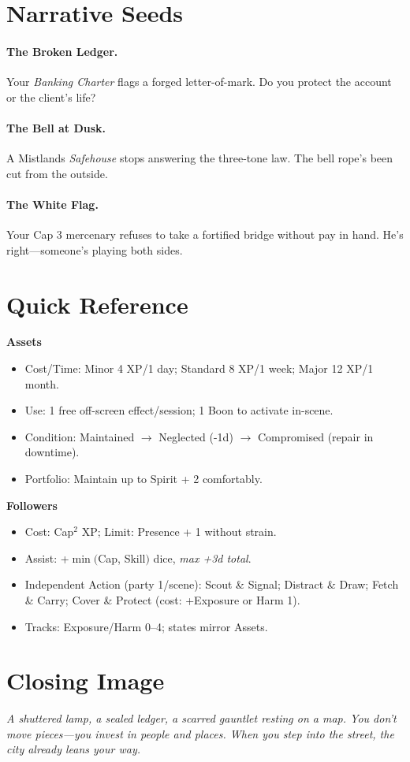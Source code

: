 \section{Narrative Seeds}
\paragraph{The Broken Ledger.}
Your \emph{Banking Charter} flags a forged letter-of-mark. Do you protect the account or the client's life?

\paragraph{The Bell at Dusk.}
A Mistlands \emph{Safehouse} stops answering the three-tone law. The bell rope's been cut from the outside.

\paragraph{The White Flag.}
Your Cap 3 mercenary refuses to take a fortified bridge without pay in hand. He's right—someone's playing both sides.

\section*{Quick Reference}
\begin{tcolorbox}[colback=blue!5!white,colframe=blue!75!black,title=Assets \& Followers Quick Reference,fonttitle=\bfseries]
\textbf{Assets}
\begin{itemize}
  \item Cost/Time: Minor 4 XP/1 day; Standard 8 XP/1 week; Major 12 XP/1 month.
  \item Use: 1 free off-screen effect/session; 1 Boon to activate in-scene.
  \item Condition: Maintained \(\rightarrow\) Neglected (-1d) \(\rightarrow\) Compromised (repair in downtime).
  \item Portfolio: Maintain up to Spirit + 2 comfortably.
\end{itemize}

\textbf{Followers}
\begin{itemize}
  \item Cost: Cap\(^2\) XP; Limit: Presence + 1 without strain.
  \item Assist: +\(\min(\)Cap, Skill\()\) dice, \textit{max +3d total}.
  \item Independent Action (party 1/scene): Scout \& Signal; Distract \& Draw; Fetch \& Carry; Cover \& Protect (cost: +Exposure or Harm 1).
  \item Tracks: Exposure/Harm 0–4; states mirror Assets.
\end{itemize}
\end{tcolorbox}

\section*{Closing Image}
\textit{A shuttered lamp, a sealed ledger, a scarred gauntlet resting on a map. You don't move pieces—you invest in people and places. When you step into the street, the city already leans your way.}